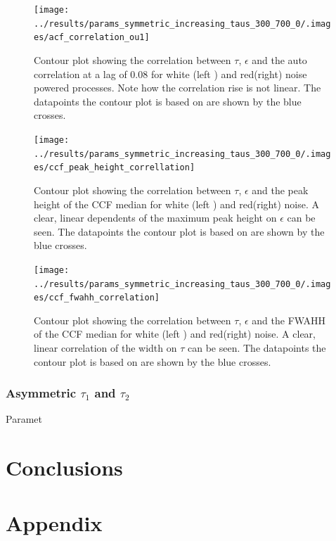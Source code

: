 \documentclass[a4paper,12pt]{book}
\theoremstyle{break}
\begin{document}
\begin{figure}[htp]
	\texttt{[image: ../results/params\_symmetric\_increasing\_taus\_300\_700\_0/.images/acf\_correlation\_ou1]}%
	\caption{Contour plot showing the correlation between $\tau$, $\epsilon$ and the auto correlation at a lag of 0.08 for white (left ) and red(right) noise powered processes. Note how the correlation rise is not linear. The datapoints  the contour plot is based on are shown by the blue crosses.}%
	\label{f/r/acf_white_sym_correlation}%
\end{figure}

\begin{figure}[htp]
	\texttt{[image: ../results/params\_symmetric\_increasing\_taus\_300\_700\_0/.images/ccf\_peak\_height\_correllation]}%
	\caption{Contour plot showing the correlation between $\tau$, $\epsilon$ and the peak height of the CCF median for white (left ) and red(right) noise. A clear, linear dependents of the maximum peak height on $\epsilon$ can be seen. The datapoints  the contour plot is based on are shown by the blue crosses.}%
	\label{f/r/ccf_white_sym_correlation_height}
\end{figure}

\begin{figure}[htp]
	\texttt{[image: ../results/params\_symmetric\_increasing\_taus\_300\_700\_0/.images/ccf\_fwahh\_correlation]}%
	\caption{Contour plot showing the correlation between $\tau$, $\epsilon$ and the \ac{FWAHH} of the CCF median for white (left ) and red(right) noise. A clear, linear correlation of the width on $\tau$ can be seen. The datapoints  the contour plot is based on are shown by the blue crosses. }%
	\label{f/r/ccf_white_sym_correlation_width}
\end{figure}

\subsection{Asymmetric $\tau_1$ and $\tau_2$}
Paramet 


\chapter{Conclusions}\label{ch/conclusion}

\chapter{Appendix}\label{ch/appendix}
\end{document}
